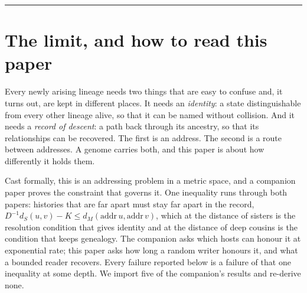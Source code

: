 \documentclass[11pt]{article}
\begin{document}
\vspace{8pt}\noindent\rule{\textwidth}{0.4pt}
\newpage\setcounter{page}{1}

\section{The limit, and how to read this paper}

Every newly arising lineage needs two things that are easy to confuse and, it turns out, are kept in different places. It needs an \emph{identity}: a state distinguishable from every other lineage alive, so that it can be named without collision. And it needs a \emph{record of descent}: a path back through its ancestry, so that its relationships can be recovered. The first is an address. The second is a route between addresses. A genome carries both, and this paper is about how differently it holds them.

Cast formally, this is an addressing problem in a metric space, and a companion paper proves the constraint that governs it. One inequality runs through both papers: histories that are far apart must stay far apart in the record, $D^{-1}d_S(u,v)-K\le d_M(\mathrm{addr}\,u,\mathrm{addr}\,v)$, which at the distance of sisters is the resolution condition that gives identity and at the distance of deep cousins is the condition that keeps genealogy. The companion asks which hosts can honour it at exponential rate; this paper asks how long a random writer honours it, and what a bounded reader recovers. Every failure reported below is a failure of that one inequality at some depth. We import five of the companion's results and re-derive none.
\end{document}
